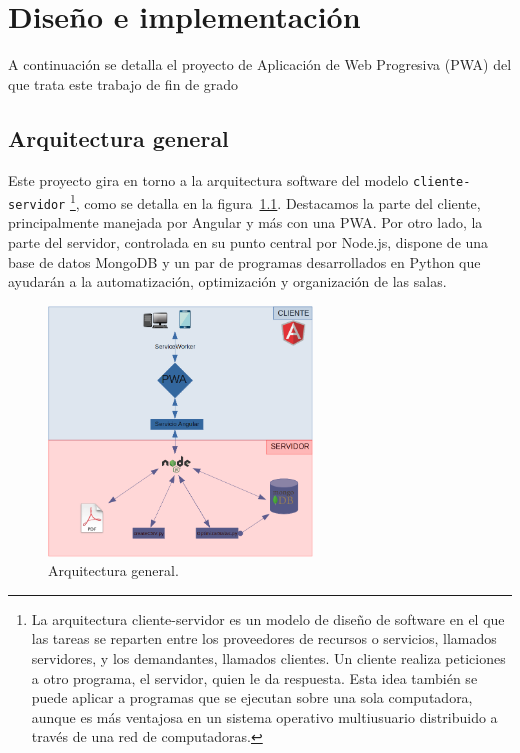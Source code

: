 \documentclass[a4paper, 12pt]{book}
\begin{document}
\chapter{Diseño e implementación}

A continuación se detalla el proyecto de Aplicación de Web Progresiva (PWA) del que trata este trabajo de fin de grado

\section{Arquitectura general} 
\label{sec:arquitectura}
Este proyecto gira en torno a la arquitectura software del modelo \texttt{cliente-servidor} \footnote{La arquitectura cliente-servidor es un modelo de diseño de software en el que las tareas se reparten entre los proveedores de recursos o servicios, llamados servidores, y los demandantes, llamados clientes. Un cliente realiza peticiones a otro programa, el servidor, quien le da respuesta. Esta idea también se puede aplicar a programas que se ejecutan sobre una sola computadora, aunque es más ventajosa en un sistema operativo multiusuario distribuido a través de una red de computadoras.}, como se detalla en la figura~\ref{fig:arquitectura}. Destacamos la parte del cliente, principalmente manejada por Angular y más con una PWA. Por otro lado, la parte del servidor, controlada en su punto central por Node.js, dispone de una base de datos MongoDB y un par de programas desarrollados en Python que ayudarán a la automatización, optimización y organización de las salas.
\begin{figure}[h!]
  \centering
  \includegraphics[width=7cm, keepaspectratio]{img/arquitectura.png}
  \caption{Arquitectura general.}\label{fig:arquitectura}
\end{figure}

 
\end{document}
